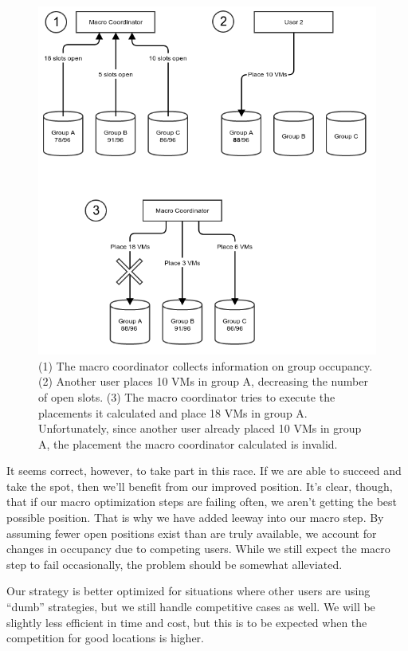 \documentclass[11pt]{article}
\begin{document}
\begin{figure}
  \centering
\includegraphics[scale=0.65]{macrodelay.png}

 \caption{(1) The macro coordinator collects information on group occupancy.  (2) Another user places 10 VMs in group A, decreasing the number of open slots.  (3) The macro coordinator tries to execute the placements it calculated and place 18 VMs in group A.  Unfortunately, since another user already placed 10 VMs in group A, the placement the macro coordinator calculated is invalid.}

 \label{fig:macrodelay}
 
\end{figure}

It seems correct, however, to take part in this race. If we are able to succeed and take the spot, then we'll benefit from our improved position.  It's clear, though, that if our macro optimization steps are failing often, we aren't getting the best possible position.  That is why we have added leeway into our macro step.  By assuming fewer open positions exist than are truly available, we account for changes in occupancy due to competing users. While we still expect the macro step to fail occasionally, the problem should be somewhat alleviated. 

Our strategy is better optimized for situations where other users are using ``dumb'' strategies, but we still handle competitive cases as well. We will be slightly less efficient in time and cost, but this is to be expected when the competition for good locations is higher.
\end{document}
